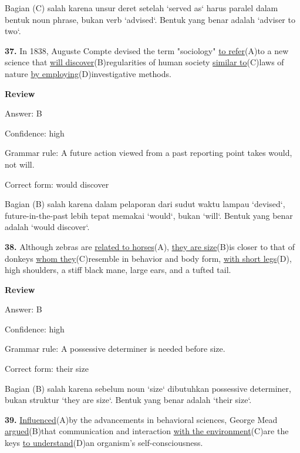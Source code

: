 \documentclass[12pt]{article}
\begin{document}
Bagian (C) salah karena unsur deret setelah `served as` harus paralel dalam bentuk noun phrase, bukan verb `advised`. Bentuk yang benar adalah `adviser to two`.\par
\endgroup
\par
\vspace{\questionblockgap}
\noindent\textbf{37.} In 1838, Auguste Compte devised the term "sociology" \uline{to refer}(A)to a new science that \uline{will discover}(B)regularities of human society \uline{similar to}(C)laws of nature \uline{by employing}(D)investigative methods.
\par
\begingroup
\setlength{\parskip}{0pt}
\setlength{\parindent}{0pt}
\textbf{Review}\par
Answer: B\par
Confidence: high\par
Grammar rule: A future action viewed from a past reporting point takes would, not will.\par
Correct form: would discover\par
Bagian (B) salah karena dalam pelaporan dari sudut waktu lampau `devised`, future-in-the-past lebih tepat memakai `would`, bukan `will`. Bentuk yang benar adalah `would discover`.\par
\endgroup
\par
\vspace{\questionblockgap}
\noindent\textbf{38.} Although zebras are \uline{related to horses}(A), \uline{they are size}(B)is closer to that of donkeys \uline{whom they}(C)resemble in behavior and body form, \uline{with short legs}(D), high shoulders, a stiff black mane, large ears, and a tufted tail.
\par
\begingroup
\setlength{\parskip}{0pt}
\setlength{\parindent}{0pt}
\textbf{Review}\par
Answer: B\par
Confidence: high\par
Grammar rule: A possessive determiner is needed before size.\par
Correct form: their size\par
Bagian (B) salah karena sebelum noun `size` dibutuhkan possessive determiner, bukan struktur `they are size`. Bentuk yang benar adalah `their size`.\par
\endgroup
\par
\vspace{\questionblockgap}
\noindent\textbf{39.} \uline{Influenced}(A)by the advancements in behavioral sciences, George Mead \uline{argued}(B)that communication and interaction \uline{with the environment}(C)are the keys \uline{to understand}(D)an organism's self-consciousness.
\end{document}
